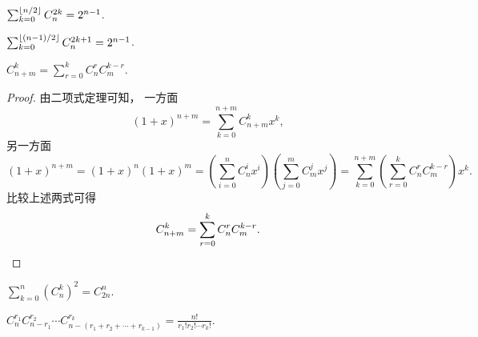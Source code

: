 \begin{property}\label{theorem:组合数性质5}
\(\sum_{k=0}^{\lfloor n/2\rfloor} C_n^{2k} = 2^{n-1}\).
\end{property}
\begin{property}\label{theorem:组合数性质6}
\(\sum_{k=0}^{\lfloor(n-1)/2\rfloor} C_n^{2k+1} = 2^{n-1}\).
\end{property}

\begin{property}\label{theorem:组合数性质7}
\(C_{n+m}^k = \sum_{r=0}^k C_n^r C_m^{k-r}\).
\begin{proof}
由二项式定理可知，
一方面\begin{equation*}
	(1+x)^{n+m}
	= \sum_{k=0}^{n+m} C_{n+m}^k x^k,
\end{equation*}
另一方面\begin{equation*}
	(1+x)^{n+m}
	= (1+x)^n (1+x)^m
	= \left( \sum_{i=0}^n C_n^i x^i \right) \left( \sum_{j=0}^m C_m^j x^j \right)
	= \sum_{k=0}^{n+m} \left( \sum_{r=0}^k C_n^r C_m^{k-r} \right) x^k.
\end{equation*}
比较上述两式可得\begin{equation*}
	C_{n+m}^k = \sum_{r=0}^k C_n^r C_m^{k-r}.
	\qedhere
\end{equation*}
\end{proof}
\end{property}

\begin{property}\label{theorem:组合数性质8}
\(\sum_{k=0}^n (C_n^k)^2 = C_{2n}^n\).
\end{property}

\begin{property}\label{theorem:组合数性质9}
\(C_n^{r_1} C_{n-r_1}^{r_2} \dotsm C_{n-(r_1+r_2+\dotsb+r_{k-1})}^{r_k}
= \frac{n!}{r_1! r_2! \dotsm r_k!}\).
\end{property}

